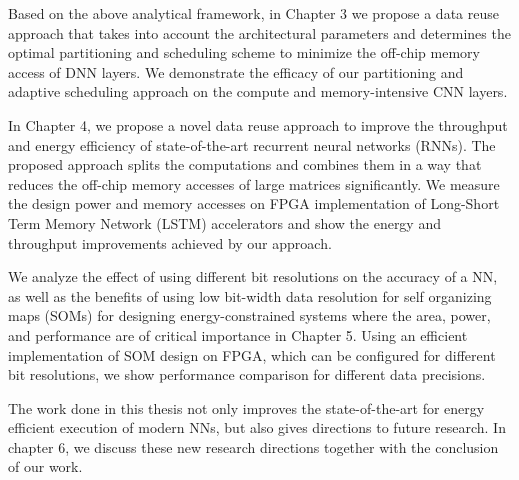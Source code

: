 Based on the above analytical framework, in Chapter 3 we propose a data reuse approach that takes into account the architectural parameters and determines the optimal partitioning and scheduling scheme to minimize the off-chip memory access of DNN layers. We demonstrate the efficacy of our partitioning and adaptive scheduling approach on the compute and memory-intensive CNN layers. 

In Chapter 4, we propose a novel data reuse approach to improve the throughput and energy efficiency of state-of-the-art recurrent neural networks (RNNs). The proposed approach splits the computations and combines them in a way that reduces the off-chip memory accesses of large matrices significantly. We measure the design power and memory accesses on FPGA implementation of Long-Short Term Memory Network (LSTM) accelerators and show the energy and throughput improvements achieved by our approach.
	
We analyze the effect of using different bit resolutions on the accuracy of a NN, as well as the benefits of using low bit-width data resolution for self organizing maps (SOMs) for designing energy-constrained systems where the area, power, and performance are of critical importance in Chapter 5. Using an efficient implementation of SOM design on FPGA, which can be configured for different bit resolutions, we show performance comparison for different data precisions. 
	
The work done in this thesis not only improves the state-of-the-art for energy efficient execution of modern NNs, but also gives directions to future research. In chapter 6, we discuss these new research directions together with the conclusion of our work.
